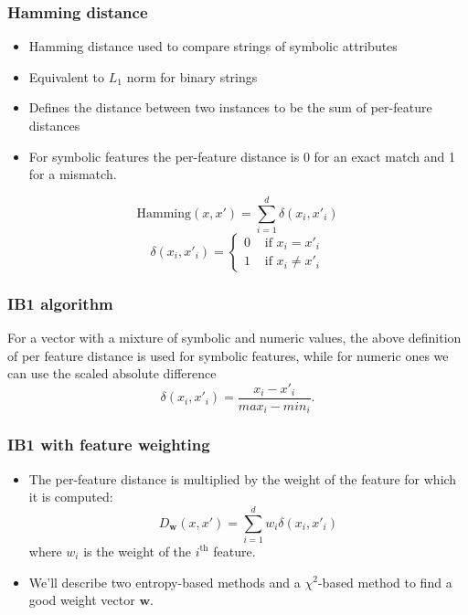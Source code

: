 \documentclass{beamer}
\newcommand{\w}{\mathbf{w}}
\begin{document}
\begin{frame}
 \frametitle{Hamming distance}
\begin{itemize}
\item Hamming distance used to compare strings of symbolic attributes
\item Equivalent to $L_1$ norm for binary strings
\item Defines the distance between two instances to be the sum of
  per-feature distances
\item For symbolic features the per-feature distance is 0 for an exact
  match and 1 for a mismatch.
\end{itemize}
\begin{block}{}
\begin{equation}
 \mathrm{Hamming}(x,x') = \sum_{i=1}^d\delta(x_i,x'_i)
\end{equation}
\begin{equation}
 \delta(x_i,x'_i) = \begin{cases}
        0                                        & \text{ if }  x_i = x'_i\\
        1                                        & \text{ if }  x_i \neq x'_i
               \end{cases}
\end{equation}
\end{block}
\end{frame}

\begin{frame}
 \frametitle{IB1 algorithm}
\begin{block}{}

  For a vector with a mixture of symbolic and numeric values, the
  above definition of per feature distance is used for symbolic
  features, while for numeric ones we can use the scaled absolute
  difference
\begin{equation}
\delta(x_i,x'_i) = \frac{x_i-x'_i}{max_i - min_i}.
\end{equation}
\end{block}
\end{frame}


\begin{frame}
  \frametitle{IB1 with feature weighting}
\begin{itemize}
\item The per-feature distance is multiplied by the weight of the
  feature for which it is computed:
 \begin{equation}
  D_{\w}(x,x') = \sum_{i=1}^d w_i\delta(x_i,x'_i)
 \end{equation}
 where $w_i$ is the weight of the $i^\text{th}$ feature.
\item We'll describe two entropy-based methods and a
  $\chi^2$-based method to find a good weight vector $\w$.
\end{itemize}
\end{frame}
\end{document}
